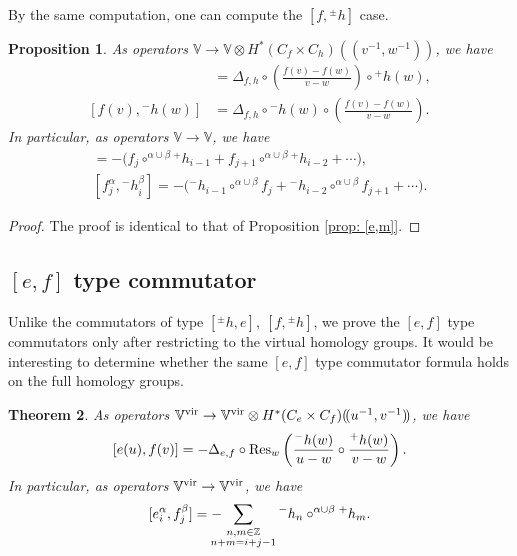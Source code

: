 \documentclass[10pt]{amsart}
\newcommand{\BZ}{\mathbb{Z}}
\newcommand{\BV}{\mathbb{V}}
\newcommand{\+}{{}^+}
\newcommand{\vir}{\textnormal{vir}}
\newcommand{\Res}{\textnormal{Res}}
\newtheorem{theorem}{Theorem}[section]
\newtheorem {proposition}[theorem]{Proposition}
\theoremstyle{definition}
\theoremstyle {definition}
\theoremstyle {definition}
\begin{document}
By the same computation, one can compute the $[f,{}^{\pm}h]$ case. 

\begin{proposition}\label{prop: [f,m]}
As operators $\BV\rightarrow \BV\otimes H^*(C_f\times C_h)(\!(v^{-1},w^{-1})\!)$, we have
\begin{align*}
    [f(v),{}^{+}h(w)]&=\Delta_{f,h}\circ \left(\frac{f(v)-f(w)}{v-w}
\right)\circ {}^{+}h(w),\\
    [f(v), {}^{-}h(w)]&=\Delta_{f,h}\circ {}^{-}h(w)\circ \left(\frac{f(v)-f(w)}{v-w}\right).
\end{align*}
In particular, as operators $\BV\rightarrow \BV$, we have 
\begin{align*}
    [f^\alpha_j,\+h_i^\beta]=-\big(f_{j}\circ^{\alpha\cup\beta}{}^{+}h_{i-1}   +f_{j+1}\circ^{\alpha\cup\beta}{}^{+}h_{i-2}+\cdots\big),\\
    [f^\alpha_j,{}^{-}h_i^\beta]=-\big({}^{-}h_{i-1}\circ^{\alpha\cup\beta}f_{j}+{}^{-}h_{i-2}\circ^{\alpha\cup\beta}f_{j+1}+\cdots\big).
\end{align*}
\end{proposition}

\begin{proof}
The proof is identical to that of Proposition \ref{prop: [e,m]}.
\end{proof}

\subsection{$[e,f]$ type commutator}

Unlike the commutators of type $[{}^\pm h, e],\ [f,{}^\pm h]$, we prove the $[e,f]$ type commutators only after restricting to the virtual homology groups. It would be interesting to determine whether the same $[e,f]$ type commutator formula holds on the full homology groups. 

\begin{theorem} \label{thm: [e,f]}
    As operators $\BV^\vir\rightarrow \BV^\vir\otimes H^*(C_e\times C_f)(\!(u^{-1},v^{-1})\!)$, we have 
    $$[e(u), f(v)]=-\Delta_{e,f}\circ \Res_w\left(
    \frac{{}^{-}h(w)}{u-w}\circ \frac{{}^{+}h(w)}{v-w}\right).
    $$
    In particular, as operators $\BV^\vir\rightarrow \BV^\vir$, we have
    $$[e^\alpha_i, f^\beta_j]=-\hspace{-10pt}\sum_{\substack{n,m\in \BZ\\ n+m=i+j-1}} {}^{-}h_n\circ^{\alpha\cup \beta}{}^{+}h_m.
    $$
\end{theorem}
\end{document}
